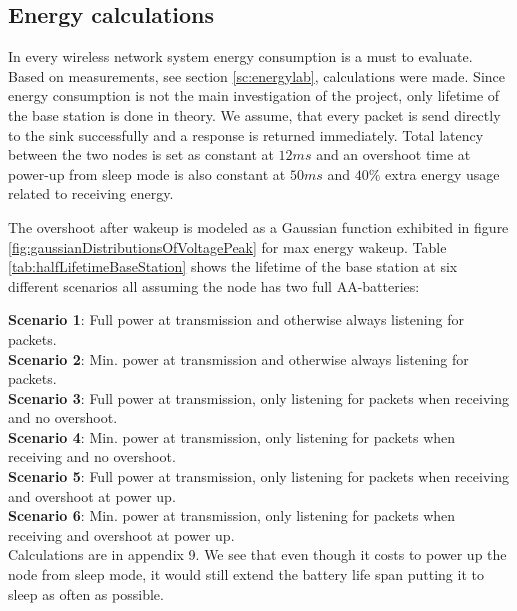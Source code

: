 \subsection{Energy calculations}\label{sc:energyCalculations}

In every wireless network system energy consumption is a must to evaluate. Based on measurements, see section \ref{sc:energylab}, calculations were made. Since energy consumption is not the main investigation of the project, only lifetime of the base station is done in theory. We assume, that every packet is send directly to the sink successfully and a response is returned immediately. Total latency between the two nodes is set as constant at $12 ms$ and an overshoot time at power-up from sleep mode is also constant at $50 ms$ and $40\%$ extra energy usage related to receiving energy.

\noindent The overshoot after wakeup is modeled as a Gaussian function exhibited in figure \ref{fig:gaussianDistributionsOfVoltagePeak} for max energy wakeup. Table \ref{tab:halfLifetimeBaseStation} shows the lifetime of the base station at six different scenarios all assuming the node has two full AA-batteries: %

\noindent \textbf{Scenario 1}: Full power at transmission and otherwise always listening for packets.\\
\textbf{Scenario 2}: Min. power at transmission and otherwise always listening for packets.\\
\textbf{Scenario 3}: Full power at transmission, only listening for packets when receiving and no overshoot.\\
\textbf{Scenario 4}: Min. power at transmission, only listening for packets when receiving and no overshoot.\\
\textbf{Scenario 5}: Full power at transmission, only listening for packets when receiving and overshoot at power up.\\
\textbf{Scenario 6}: Min. power at transmission, only listening for packets when receiving and overshoot at power up.\\

\noindent Calculations are in appendix 9. We see that even though it costs to power up the node from sleep mode, it would still extend the battery life span putting it to sleep as often as possible.

